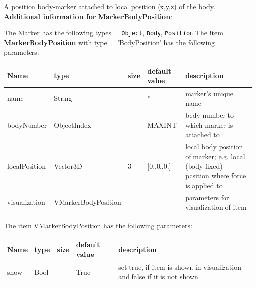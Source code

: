 %
\newpage

\label{sec:item:MarkerBodyPosition}
A position body-marker attached to local position (x,y,z) of the body.\vspace{12pt}
 \\{\bf Additional information for MarkerBodyPosition}:
\bi
  \item The Marker has the following types = \texttt{Object}, \texttt{Body}, \texttt{Position}
\ei
\vspace{12pt} \noindent The item {\bf MarkerBodyPosition} with type = 'BodyPosition' has the following parameters:\vspace{-1cm}\\ 
\begin{center}
  \footnotesize
  \begin{longtable}{| p{4.5cm} | p{2.5cm} | p{0.5cm} | p{2.5cm} | p{6cm} |}
    \hline
    \bf Name & \bf type & \bf size & \bf default value & \bf description \\ \hline
    name &     String &      &     '' &     marker's unique name\\ \hline
    bodyNumber &     ObjectIndex &      &     MAXINT &     body number to which marker is attached to\\ \hline
    localPosition &     Vector3D &     3 &     [0.,0.,0.] &     local body position of marker; e.g. local (body-fixed) position where force is applied to\\ \hline
    visualization & VMarkerBodyPosition & & & parameters for visualization of item \\ \hline
	  \end{longtable}
	\end{center}
The item VMarkerBodyPosition has the following parameters:\vspace{-1cm}\\ 
\begin{center}
  \footnotesize
  \begin{longtable}{| p{4.5cm} | p{2.5cm} | p{0.5cm} | p{2.5cm} | p{6cm} |}
    \hline
    \bf Name & \bf type & \bf size & \bf default value & \bf description \\ \hline
    show &     Bool &      &     True &     set true, if item is shown in visualization and false if it is not shown\\ \hline
	  \end{longtable}
	\end{center}

